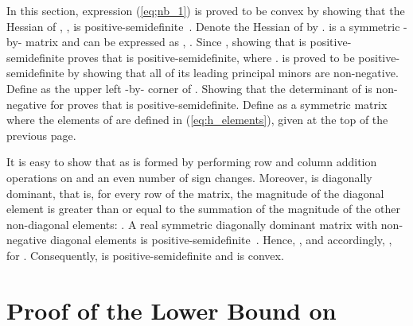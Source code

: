\documentclass[11pt,draftclsnofoot,journal,onecolumn]{IEEEtran}
\begin{document}
\begin{IEEEproof}
In this section, expression (\ref{eq;nb_1}) is proved to be convex by showing that the Hessian of , , is positive-semidefinite~\cite{berghe}. Denote the Hessian of  by .  is a symmetric -by- matrix and can be expressed as , . Since , showing that  is positive-semidefinite proves that  is positive-semidefinite, where .  is proved to be positive-semidefinite by showing that all of its  leading principal minors are non-negative. Define  as the upper left -by- corner of . Showing that the determinant of  is non-negative for  proves that  is positive-semidefinite. Define  as a symmetric matrix where the elements of  are defined in (\ref{eq:h_elements}), given at the top of the previous page. 

It is easy to show that  as  is formed by performing row and column addition operations on  and an even number of sign changes. Moreover,  is diagonally dominant, that is, for every row of the matrix, the magnitude of the diagonal element is greater than or equal to the summation of the magnitude of the other non-diagonal elements: . A real symmetric diagonally dominant matrix with non-negative diagonal elements is positive-semidefinite~\cite[Ch. 6]{matrix_book}. Hence, , and accordingly, , for . Consequently,  is positive-semidefinite and  is convex.
\end{IEEEproof}

\section{Proof of the Lower Bound on }
\label{sec:math_ind_u}
\end{document}
